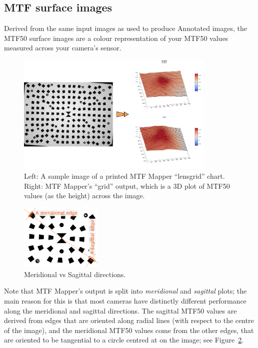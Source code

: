 \documentclass[a4paper]{article}
\begin{document}
\subsection{MTF surface images}
Derived from the same input images as used to produce \textsf{Annotated
images}, the MTF50 surface images are a colour representation of your MTF50
values measured across your camera's sensor.

\begin{figure}[!ht]
\centering
\includegraphics[width=0.85\textwidth]{figures/surface_example}
\caption{Left: A sample image of a printed MTF Mapper ``lensgrid'' chart.
Right: MTF Mapper's ``grid'' output, which is a 3D plot of MTF50 values (as
the height) across the image.
}
\label{fig:surface_example}
\end{figure}

\begin{figure}
\centering
\includegraphics[width=0.35\textwidth]{figures/meridional_sagittal}
\caption{Meridional vs Sagittal directions.}
\label{fig:ms_directions}
\end{figure}

Note that MTF Mapper's output is split into \emph{meridional} and
\emph{sagittal} plots; the main reason for this is that most cameras have
distinctly different performance along the meridional and sagittal
directions. The sagittal MTF50 values are derived from edges that are
oriented along radial lines (with respect to the centre of the image), and
the meridional MTF50 values come from the other edges, that are oriented to
be tangential to a circle centred at on the image; see
Figure~\ref{fig:ms_directions}.
\end{document}
